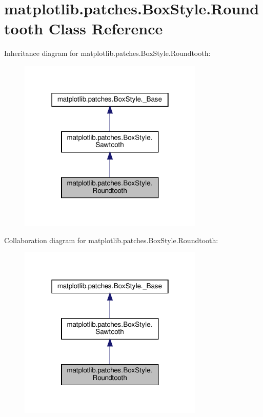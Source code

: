 \hypertarget{classmatplotlib_1_1patches_1_1BoxStyle_1_1Roundtooth}{}\section{matplotlib.\+patches.\+Box\+Style.\+Roundtooth Class Reference}
\label{classmatplotlib_1_1patches_1_1BoxStyle_1_1Roundtooth}


Inheritance diagram for matplotlib.\+patches.\+Box\+Style.\+Roundtooth\+:
\nopagebreak
\begin{figure}[H]
\begin{center}
\leavevmode
\includegraphics[width=250pt]{classmatplotlib_1_1patches_1_1BoxStyle_1_1Roundtooth__inherit__graph}
\end{center}
\end{figure}


Collaboration diagram for matplotlib.\+patches.\+Box\+Style.\+Roundtooth\+:
\nopagebreak
\begin{figure}[H]
\begin{center}
\leavevmode
\includegraphics[width=250pt]{classmatplotlib_1_1patches_1_1BoxStyle_1_1Roundtooth__coll__graph}
\end{center}
\end{figure}

